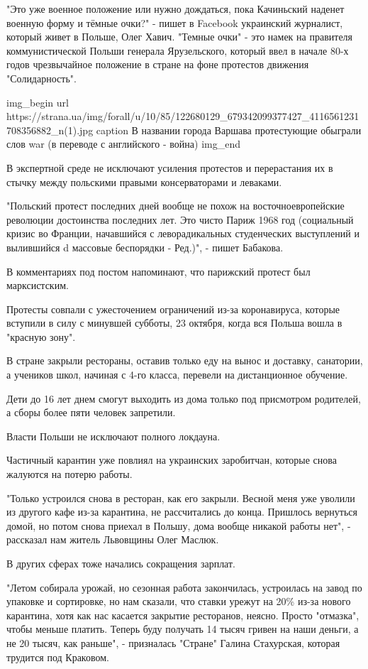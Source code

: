 "Это уже военное положение или нужно дождаться, пока Качиньский наденет военную
форму и тёмные очки?" - пишет в Facebook украинский журналист, который живет в
Польше, Олег Хавич. "Темные очки" - это намек на правителя коммунистической
Польши генерала Ярузельского, который ввел в начале 80-х годов чрезвычайное
положение в стране на фоне протестов движения "Солидарность". 

\ifcmt
img_begin 
  url https://strana.ua/img/forall/u/10/85/122680129_679342099377427_4116561231708356882_n(1).jpg
  caption В названии города Варшава протестующие обыграли слов war (в переводе с английского - война)
img_end
\fi

В экспертной среде не исключают усиления протестов и перерастания их в стычку
между польскими правыми консерваторами и леваками. 

"Польский протест последних дней вообще не похож на восточноевропейские
революции достоинства последних лет. Это чисто Париж 1968 год (социальный
кризис во Франции, начавшийся с леворадикальных студенческих выступлений и
вылившийся d массовые беспорядки - Ред.)", - пишет Бабакова. 

В комментариях под постом напоминают, что парижский протест был марксистским.

Протесты совпали с ужесточением ограничений из-за коронавируса, которые
вступили в силу с минувшей субботы, 23 октября, когда вся Польша вошла в
"красную зону".

В стране закрыли рестораны, оставив только еду на вынос и доставку, санатории,
а учеников школ, начиная с 4-го класса, перевели на дистанционное обучение.

Дети до 16 лет днем смогут выходить из дома только под присмотром родителей, а
сборы более пяти человек запретили.

Власти Польши не исключают полного локдауна.

Частичный карантин уже повлиял на украинских заробитчан, которые снова жалуются
на потерю работы.

"Только устроился снова в ресторан, как его закрыли. Весной меня уже уволили из
другого кафе из-за карантина, не рассчитались до конца. Пришлось вернуться
домой, но потом снова приехал в Польшу, дома вообще никакой работы нет", -
рассказал нам житель Львовщины Олег Маслюк.

В других сферах тоже начались сокращения зарплат.

"Летом собирала урожай, но сезонная работа закончилась, устроилась на завод по
упаковке и сортировке, но нам сказали, что ставки урежут на 20\% из-за нового
карантина, хотя как нас касается закрытие ресторанов, неясно. Просто "отмазка",
чтобы меньше платить. Теперь буду получать 14 тысяч гривен на наши деньги, а не
20 тысяч, как раньше", - призналась "Стране" Галина Стахурская, которая
трудится под Краковом.
